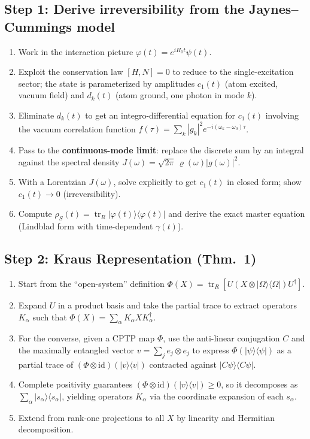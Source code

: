 \documentclass[11pt,a4paper]{article}
\begin{document}
\subsection*{Step 1: Derive irreversibility from the Jaynes--Cummings model}
\begin{enumerate}[nosep]
  \item Work in the interaction picture $\varphi(t) = e^{iH_0 t}\psi(t)$.
  \item Exploit the conservation law $[H,N]=0$ to reduce to the single-excitation sector; the state is parameterized by amplitudes $c_1(t)$ (atom excited, vacuum field) and $d_k(t)$ (atom ground, one photon in mode $k$).
  \item Eliminate $d_k(t)$ to get an integro-differential equation for $c_1(t)$ involving the vacuum correlation function $f(\tau) = \sum_k |g_k|^2 e^{-i(\omega_k - \omega_0)\tau}$.
  \item Pass to the \textbf{continuous-mode limit}: replace the discrete sum by an integral against the spectral density $J(\omega) = \sqrt{2\pi}\,\varrho(\omega)|g(\omega)|^2$.
  \item With a Lorentzian $J(\omega)$, solve explicitly to get $c_1(t)$ in closed form; show $c_1(t) \to 0$ (irreversibility).
  \item Compute $\rho_S(t) = \operatorname{tr}_R|\varphi(t)\rangle\langle\varphi(t)|$ and derive the exact master equation (Lindblad form with time-dependent $\gamma(t)$).
\end{enumerate}

\subsection*{Step 2: Kraus Representation (Thm.~1)}
\begin{enumerate}[nosep]
  \item Start from the ``open-system'' definition $\Phi(X) = \operatorname{tr}_R[U(X\otimes|\Omega\rangle\langle\Omega|)U^\dagger]$.
  \item Expand $U$ in a product basis and take the partial trace to extract operators $K_\alpha$ such that $\Phi(X) = \sum_\alpha K_\alpha X K_\alpha^\dagger$.
  \item For the converse, given a CPTP map $\Phi$, use the anti-linear conjugation $C$ and the maximally entangled vector $v = \sum_j e_j \otimes e_j$ to express $\Phi(|\psi\rangle\langle\psi|)$ as a partial trace of $(\Phi\otimes\mathrm{id})(|v\rangle\langle v|)$ contracted against $|C\psi\rangle\langle C\psi|$.
  \item Complete positivity guarantees $(\Phi\otimes\mathrm{id})(|v\rangle\langle v|) \ge 0$, so it decomposes as $\sum_\alpha |s_\alpha\rangle\langle s_\alpha|$, yielding operators $K_\alpha$ via the coordinate expansion of each $s_\alpha$.
  \item Extend from rank-one projections to all $X$ by linearity and Hermitian decomposition.
\end{enumerate}
\end{document}
